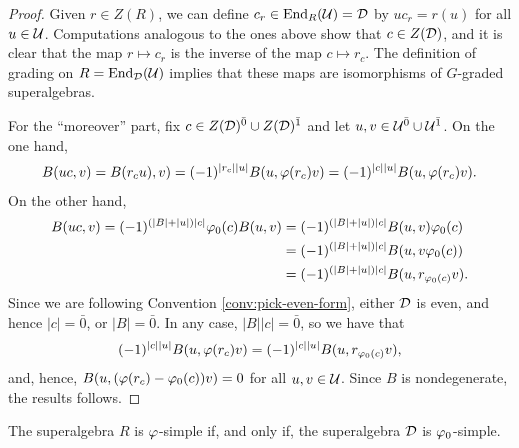 \begin{proof}
	Given $r\in Z(R)$, we can define $c_r\in \operatorname{End}_R (\mathcal U) =\mathcal{D}$ by $uc_r = r(u)$ for all $u\in \mathcal U$.
	Computations analogous to the ones above show that $c\in Z(\mathcal{D})$, and it is clear that the map $r\mapsto c_r$ is the inverse of the map $c \mapsto r_c$.
	The definition of grading on $R = \operatorname{End}_{\mathcal{D}} (\mathcal U)$ implies that these maps are isomorphisms of $G$-graded superalgebras.

	For the ``moreover'' part, fix $c\in Z(\mathcal{D})^{\bar0} \cup Z(\mathcal{D})^{\bar1}$ and let $u, v \in \mathcal U^{\bar0} \cup \mathcal U^{\bar1}$.
	On the one hand,
	\begin{align*}
		B(uc,v) = B(r_c u), v) = (-1)^{|r_c||u|} B(u, \varphi(r_c) v) = (-1)^{|c||u|} B(u, \varphi(r_c) v).
	\end{align*}
	On the other hand,
	\begin{align*}
		B(uc, v) = (-1)^{(|B| + |u|) |c|} \varphi_0(c) B(u, v) & = (-1)^{(|B| + |u|) |c|} B(u, v) \varphi_0(c)     \\
		                                                     & = (-1)^{(|B| + |u|) |c|} B(u, v \varphi_0(c) )    \\
		                                                     & = (-1)^{(|B| + |u|) |c|} B(u, r_{\varphi_0(c)}v).
	\end{align*}
	Since we are following Convention \ref{conv:pick-even-form}, either $\mathcal{D}$ is even, and hence $|c| = \bar 0$, or
	$|B| = \bar 0$.
	In any case, $|B||c| = \bar 0$, so we have that \[(-1)^{|c||u|} B(u, \varphi(r_c) v) = (-1)^{|c||u|} B(u, r_{\varphi_0(c)}v),\] and, hence, $B(u, (\varphi(r_c) - \varphi_0(c)) v) = 0$ for all $u, v \in \mathcal U$.
	Since $B$ is nondegenerate, the results follows.
\end{proof}

\begin{prop}\label{prop:vphi-R-simple-D-simple}
	The superalgebra $R$ is $\varphi$-simple if, and only if, the superalgebra $\mathcal{D}$ is $\varphi_0$-simple.
\end{prop}

